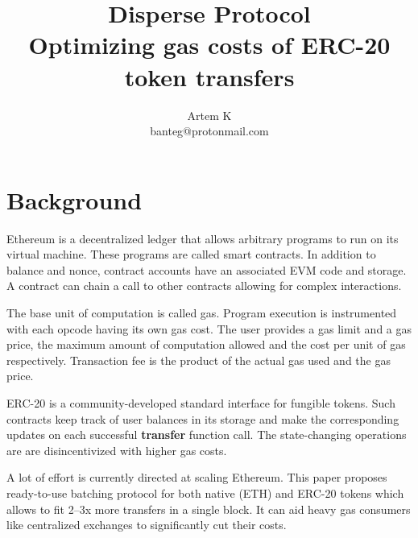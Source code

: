 \documentclass[12pt]{article}
\begin{document}
\title{
	Disperse Protocol\\
	\Large{Optimizing gas costs of ERC-20 token transfers}
}
\author{Artem K\\ \small{banteg@protonmail.com}}

\maketitle
{}

\section{Background}
Ethereum is a decentralized ledger that allows arbitrary programs to run on its virtual machine.
These programs are called smart contracts.
In addition to balance and nonce, contract accounts have an associated EVM code and storage.
A contract can chain a call to other contracts allowing for complex interactions.\cite{ethereum}

The base unit of computation is called gas.
Program execution is instrumented with each opcode having its own gas cost.
The user provides a gas limit and a gas price, the maximum amount of computation allowed and the cost per unit of gas respectively.
Transaction fee is the product of the actual gas used and the gas price.

ERC-20 is a community-developed standard interface for fungible tokens\cite{eip20}.
Such contracts keep track of user balances in its storage and make the corresponding updates on each successful \textbf{transfer} function call.
The state-changing operations are are disincentivized with higher gas costs.

A lot of effort is currently directed at scaling Ethereum.
This paper proposes ready-to-use batching protocol for both native (ETH) and ERC-20 tokens which allows to fit 2--3x more transfers in a single block.
It can aid heavy gas consumers like centralized exchanges to significantly cut their costs.
\end{document}
